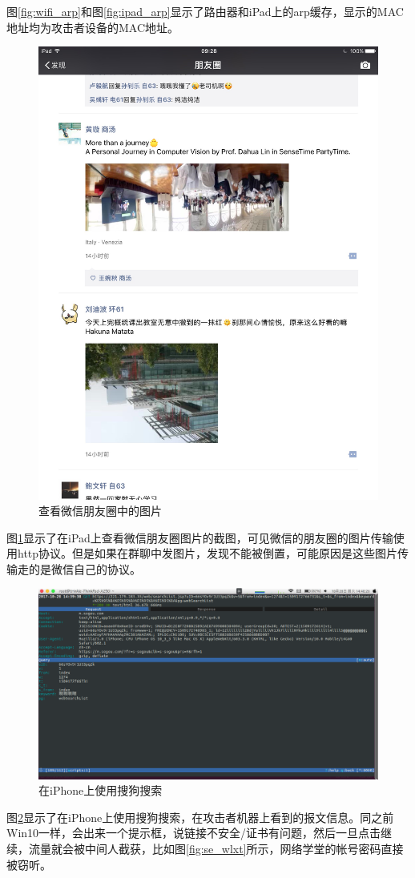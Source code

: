 \documentclass[a4paper]{article}
\begin{document}
图\ref{fig:wifi_arp}和图\ref{fig:ipad_arp}显示了路由器和iPad上的arp缓存，显示的MAC地址均为攻击者设备的MAC地址。

\begin{figure}[htp]
\centering
\includegraphics[width=0.6\linewidth]{ipad_wx.jpg}
\caption{查看微信朋友圈中的图片}
\label{fig:ipad_wx}
\end{figure}

图\ref{fig:ipad_wx}显示了在iPad上查看微信朋友圈图片的截图，可见微信的朋友圈的图片传输使用http协议。但是如果在群聊中发图片，发现不能被倒置，可能原因是这些图片传输走的是微信自己的协议。

\begin{figure}[htp]
\centering
\includegraphics[width=0.9\linewidth]{se_sogou.png}
\caption{在iPhone上使用搜狗搜索}
\label{fig:se_sogou}
\end{figure}

图\ref{fig:se_sogou}显示了在iPhone上使用搜狗搜索，在攻击者机器上看到的报文信息。同之前Win10一样，会出来一个提示框，说链接不安全/证书有问题，然后一旦点击继续，流量就会被中间人截获，比如图\ref{fig:se_wlxt}所示，网络学堂的帐号密码直接被窃听。
\end{document}
